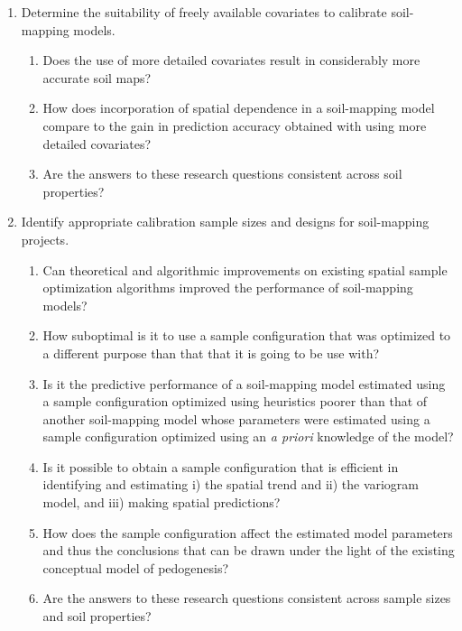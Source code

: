 \begin{enumerate}
\item Determine the suitability of freely available covariates to calibrate soil-mapping models.

	\begin{enumerate}[label=(\alph*)]
	\item Does the use of more detailed covariates result in considerably more accurate soil 
	maps?

	\item How does incorporation of spatial dependence in a soil-mapping model compare to the 
	gain in prediction accuracy obtained with using more detailed covariates?

	\item Are the answers to these research questions consistent across soil properties?
	\end{enumerate}

\item Identify appropriate calibration sample sizes and designs for soil-mapping projects.

	\begin{enumerate}[label=(\alph*)]
	\item Can theoretical and algorithmic improvements on existing spatial sample optimization 
	algorithms improved the performance of soil-mapping models?
	
	\item How suboptimal is it to use a sample configuration that was optimized to a different 
	purpose than that that it is going to be use with?

	\item Is it the predictive performance of a soil-mapping model estimated using a sample 
	configuration optimized using heuristics poorer than that of another soil-mapping model 
	whose parameters were estimated using a sample configuration optimized using an 
	\textit{a priori} knowledge of the model?
	
	\item Is it possible to obtain a sample configuration that is efficient in identifying and
	estimating i) the spatial trend and ii) the variogram model, and iii) making spatial 
	predictions?
	
	\item How does the sample configuration affect the estimated model parameters and thus the
	conclusions that can be drawn under the light of the existing conceptual model of 
	pedogenesis?
	
	\item Are the answers to these research questions consistent across sample sizes and soil 
	properties?
	\end{enumerate}
\end{enumerate}

